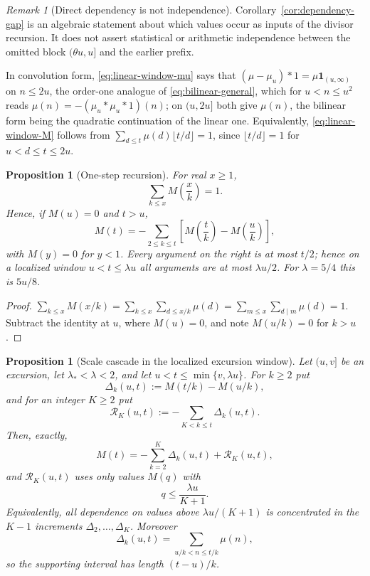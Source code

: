 \documentclass[11pt]{amsart}
\numberwithin{equation}{section}
\theoremstyle{plain}
\newtheorem{proposition}[theorem]{Proposition}
\theoremstyle{definition}
\theoremstyle{remark}
\newtheorem{remark}[theorem]{Remark}
\begin{document}
\begin{remark}[Direct dependency is not independence]
Corollary~\ref{cor:dependency-gap} is an algebraic statement about which
values occur as inputs of the divisor recursion.  It does not assert
statistical or arithmetic independence between the omitted block
$(\theta u,u]$ and the earlier prefix.
\end{remark}

In convolution form, \eqref{eq:linear-window-mu} says that
$(\mu-\mu_u)*1=\mu\mathbf 1_{(u,\infty)}$ on $n\le2u$, the order-one analogue
of \eqref{eq:bilinear-general}, which for $u<n\le u^2$ reads
$\mu(n)=-(\mu_u*\mu_u*1)(n)$; on $(u,2u]$ both give $\mu(n)$, the
bilinear form being the quadratic continuation of the linear one. Equivalently, \eqref{eq:linear-window-M}
follows from $\sum_{d\le t}\mu(d)\lfloor t/d\rfloor=1$, since
$\lfloor t/d\rfloor=1$ for $u<d\le t\le2u$.

\begin{proposition}[One-step recursion]
\label{prop:one-step}
For real $x\ge1$,
\begin{equation}
\label{eq:hyperbola-M}
\sum_{k\le x}M\!\left(\frac xk\right)=1 .
\end{equation}
Hence, if $M(u)=0$ and $t>u$,
\begin{equation}
\label{eq:descent-identity}
M(t)=-\sum_{2\le k\le t}\left[M\!\left(\frac tk\right)-M\!\left(\frac uk\right)\right],
\end{equation}
with $M(y)=0$ for $y<1$. Every argument on the right is at most $t/2$; hence on a localized
window $u<t\le\lambda u$ all arguments are at most $\lambda u/2$.  For
$\lambda=5/4$ this is $5u/8$.
\end{proposition}

\begin{proof}
$\sum_{k\le x}M(x/k)=\sum_{k\le x}\sum_{d\le x/k}\mu(d)
=\sum_{m\le x}\sum_{d\mid m}\mu(d)=1$. Subtract the identity at $u$, where
$M(u)=0$, and note $M(u/k)=0$ for $k>u$.
\end{proof}

\begin{proposition}[Scale cascade in the localized excursion window]
\label{prop:scale-cascade}
Let $(u,v]$ be an excursion, let $\lambda_*<\lambda<2$, and let
$u<t\le\min\{v,\lambda u\}$.  For $k\ge2$ put
\[
\Delta_k(u,t):=M(t/k)-M(u/k),
\]
and for an integer $K\ge2$ put
\[
\mathcal R_K(u,t):=-\sum_{K<k\le t}\Delta_k(u,t).
\]
Then, exactly,
\begin{equation}
\label{eq:scale-cascade}
M(t)=-\sum_{k=2}^{K}\Delta_k(u,t)+\mathcal R_K(u,t),
\end{equation}
and $\mathcal R_K(u,t)$ uses only values $M(q)$ with
\[
q\le\frac{\lambda u}{K+1}.
\]
Equivalently, all dependence on values above $\lambda u/(K+1)$ is
concentrated in the $K-1$ increments
$\Delta_2,\ldots,\Delta_K$.  Moreover
\[
\Delta_k(u,t)=\sum_{u/k<n\le t/k}\mu(n),
\]
so the supporting interval has length $(t-u)/k$.
\end{proposition}
\end{document}
